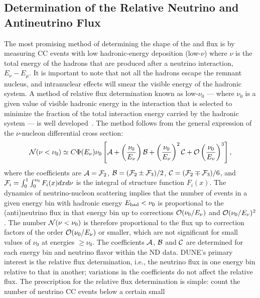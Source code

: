 \subsection{Determination of the Relative Neutrino and Antineutrino Flux} 
\label{sec-lownu0}
The most promising method of determining the shape of the \numu and
\anumu flux is by measuring CC events with low 
hadronic-energy deposition (low-$\nu$) where $\nu$ is the total energy of the
hadrons that are produced after a neutrino interaction, $E_\nu -
E_\mu$. It is important to note that not all the hadrons escape the
remnant nucleus, and intranuclear effects will smear the visible energy
of the hadronic system.  A method of relative flux determination known
as low-$\nu_0$ --- where $\nu_0$ is a given value of visible hadronic
energy in the interaction that is selected to minimize the fraction of
the total interaction energy carried by the hadronic system
--- is well developed~\cite{srmishra-reviewtalk}.  The method follows
from the general expression of the $\nu$-nucleon differential cross
section:
\begin{equation}
{\cal N} (\nu < \nu_0) \simeq C \Phi(E_\nu) \nu_0 \left[ {\cal A} +
\left( \frac{\nu_0}{E_\nu} \right) {\cal B} + \left( \frac{\nu_0}{E_\nu} \right)^2 {\cal C} +
{\cal O} \left( \frac{\nu_0}{E_\nu} \right)^3 \right],
\end{equation}
\noindent
where the coefficients are ${\cal A} = {\cal F}_2$, ${\cal B} = ({\cal
  F}_2 \pm {\cal F}_3)/2$, ${\cal C} = ({\cal F}_2 \mp {\cal F}_3)/6$, 
and ${\cal F}_i =\int^1_0 \int^{\nu_0}_0 F_i(x) dx d\nu$ is the
integral of structure function $F_i(x)$.  
%
The dynamics of
neutrino-nucleon scattering  implies that the number of events in a
given energy bin with hadronic energy $E_{\rm had} < \nu_0$ is
proportional to the (anti)neutrino flux in that energy bin up
to corrections ${\cal O}(\nu_0/E_\nu)$ and ${\cal O}(\nu_0/E_\nu)^2$.
%
The number ${\cal
  N}(\nu<\nu_0)$ is therefore proportional to the flux up to correction factors
of the order ${\cal O} (\nu_0/E_\nu)$ or smaller, which are not
significant for small values of $\nu_0$ at energies $\geq \nu_0$. 
 The coefficients ${\cal A}$, ${\cal B}$ and ${\cal C}$ are
determined for each energy bin and neutrino flavor within the ND data.
DUNE's primary interest is the relative flux
determination, i.e., the neutrino flux in one energy bin relative to that in
another; variations in the coefficients do not affect the
relative flux. The prescription for the relative flux determination is
simple: count the number of %
neutrino CC events below a certain small
